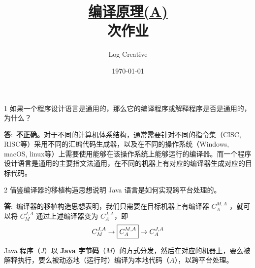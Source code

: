 \documentclass[12pt,a4paper]{article}
\newenvironment{problems}{\begin{list}{}{\renewcommand{\makelabel}[1]{\textbf{##1}\hfil}}}{\end{list}}
\providecommand{\ans}{\textbf{答}:~}
\begin{document}
\title{\normalsize \underline{编译原理(A)}\\ 次作业}
\author{Log Creative }
\date{\today}
\maketitle

\begin{problems}
    \item[1] 如果一个程序设计语言是通用的，那么它的编译程序或解释程序是否是通用的，为什么？
     
    \ans \textbf{不正确。}对于不同的计算机体系结构，通常需要针对不同的指令集（CISC, RISC等）采用不同的汇编代码生成器，以及在不同的操作系统（Windows, macOS, linux等）上需要使用能够在该操作系统上能够运行的编译器。而一个程序设计语言是通用的主要指文法通用，在不同的机器上有对应的编译器生成对应的目标代码。
    \item[2] 借鉴编译器的移植构造思想说明 Java 语言是如何实现跨平台处理的。
    
    \ans 编译器的移植构造思想表明，我们只需要在目标机器上有编译器 $C^{M,A}_{A}$ ，就可以将 $C^{J,A}_{M}$ 通过上述编译器变为 $C^{J,A}_{A}$，即
    \begin{equation*}
        C^{J,A}_{M}\rightarrow \fbox{$C^{M,A}_{A}$}\rightarrow C^{J,A}_{A}
    \end{equation*}

    Java 程序（$J$）以 \textbf{Java 字节码}（$M$）的方式分发，然后在对应的机器上，要么被解释执行，要么被动态地（运行时）编译为本地代码（$A$），以跨平台处理。
\end{problems}
\end{document}
